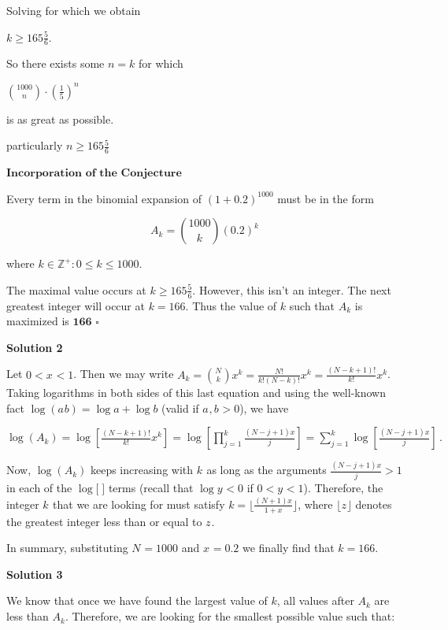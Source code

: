 \begin{enumerate}
 Solving for which we obtain

 \( k \ge 165 \frac{5}{6} \). 

 So there exists some \( n=k \) for which 

 \( \binom{1000}{n} \cdot \left(\frac{1}{5}\right)^n \)

 is as great as possible.

 particularly \( n \ge 165 \frac{5}{6} \)

 $\textbf{Incorporation of the Conjecture}$

 Every term in the binomial expansion of \( (1+0.2)^{1000} \) must be in the form 

 
 \[A_k = \binom{1000}{k}(0.2)^k\]

 where \( k \in \mathbb{Z}^+ : 0 \le k \le 1000 \).

 The maximal value occurs at \( k \ge 165 \frac{5}{6} \). However, this isn't an integer. The next greatest integer will occur at \( k = 166 \). Thus the value of \( k \) such that \( A_k \) is maximized is \(\boxed{\textbf{166}}\) \(\square\)

 



\textbf{Solution 2}

Let $0<x_{}^{}<1$. Then we may write $A_{k}^{}={N\choose k}x^{k}=\frac{N!}{k!(N-k)!}x^{k}=\frac{(N-k+1)!}{k!}x^{k}$. Taking logarithms in both sides of this last equation and using the well-known fact $\log(a_{}^{}b)=\log a + \log b$ (valid if $a_{}^{},b_{}^{}>0$), we have

 $\log(A_{k})=\log\left[\frac{(N-k+1)!}{k!}x^{k}\right]=\log\left[\prod_{j=1}^{k}\frac{(N-j+1)x}{j}\right]=\sum_{j=1}^{k}\log\left[\frac{(N-j+1)x}{j}\right]\, .$

 Now, $\log(A_{k}^{})$ keeps increasing with $k_{}^{}$ as long as the arguments $\frac{(N-j+1)x}{j}>1$ in each of the $\log\big[\;\big]$ terms (recall that $\log y_{}^{} <0$ if $0<y_{}^{}<1$). Therefore, the integer $k_{}^{}$ that we are looking for must satisfy $k=\Big\lfloor\frac{(N+1)x}{1+x}\Big\rfloor$, where $\lfloor z_{}^{}\rfloor$ denotes the greatest integer less than or equal to $z_{}^{}$. 

 In summary, substituting $N_{}^{}=1000$ and $x_{}^{}=0.2$ we finally find that $k=\boxed{166}$.

 



\textbf{Solution 3}

We know that once we have found the largest value of $k$, all values after $A_k$ are less than $A_k$. Therefore, we are looking for the smallest possible value such that:


\end{enumerate}
